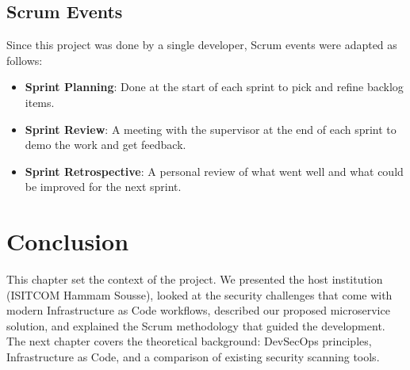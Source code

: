 \subsection{Scrum Events}

Since this project was done by a single developer, Scrum events were adapted as follows:

\begin{itemize}[leftmargin=1.5cm]
  \item \textbf{Sprint Planning}: Done at the start of each sprint to pick and refine backlog items.
  \item \textbf{Sprint Review}: A meeting with the supervisor at the end of each sprint to demo the work and get feedback.
  \item \textbf{Sprint Retrospective}: A personal review of what went well and what could be improved for the next sprint.
\end{itemize}


\section{Conclusion}

This chapter set the context of the project. We presented the host institution (ISITCOM Hammam Sousse), looked at the security challenges that come with modern Infrastructure as Code workflows, described our proposed microservice solution, and explained the Scrum methodology that guided the development. The next chapter covers the theoretical background: DevSecOps principles, Infrastructure as Code, and a comparison of existing security scanning tools.
